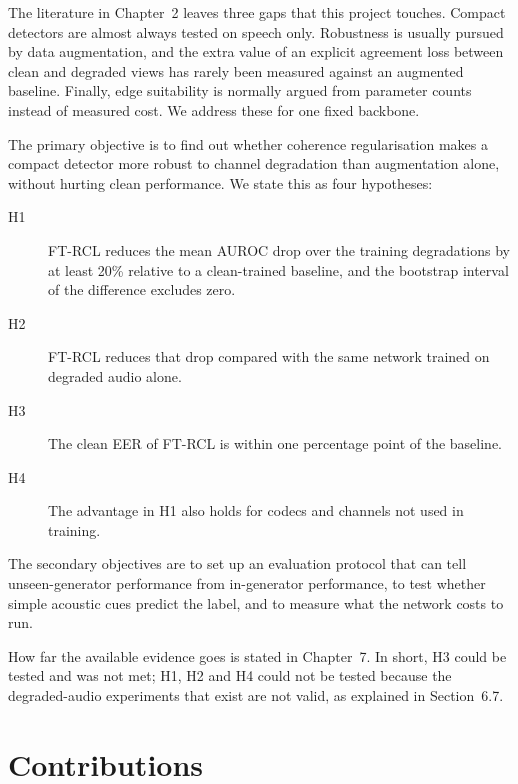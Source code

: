\documentclass[12pt,a4paper]{report}
\begin{document}
The literature in Chapter~2 leaves three gaps that this project touches. Compact detectors are almost always tested on speech only. Robustness is usually pursued by data augmentation, and the extra value of an explicit agreement loss between clean and degraded views has rarely been measured against an augmented baseline. Finally, edge suitability is normally argued from parameter counts instead of measured cost. We address these for one fixed backbone.

The primary objective is to find out whether coherence regularisation makes a compact detector more robust to channel degradation than augmentation alone, without hurting clean performance. We state this as four hypotheses:

\begin{description}
  \item[H1] FT-RCL reduces the mean AUROC drop over the training degradations by at least 20\% relative to a clean-trained baseline, and the bootstrap interval of the difference excludes zero.
  \item[H2] FT-RCL reduces that drop compared with the same network trained on degraded audio alone.
  \item[H3] The clean EER of FT-RCL is within one percentage point of the baseline.
  \item[H4] The advantage in H1 also holds for codecs and channels not used in training.
\end{description}

The secondary objectives are to set up an evaluation protocol that can tell unseen-generator performance from in-generator performance, to test whether simple acoustic cues predict the label, and to measure what the network costs to run.

How far the available evidence goes is stated in Chapter~7. In short, H3 could be tested and was not met; H1, H2 and H4 could not be tested because the degraded-audio experiments that exist are not valid, as explained in Section~6.7.

\section{Contributions}
\end{document}
